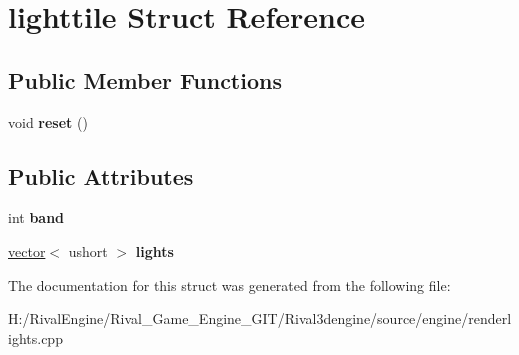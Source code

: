 \hypertarget{structlighttile}{}\section{lighttile Struct Reference}
\label{structlighttile}
\subsection*{Public Member Functions}
\begin{DoxyCompactItemize}
\item 
\mbox{\label{structlighttile_afc9c564e435036b9af2e6812824ee66f}} 
void {\bfseries reset} ()
\end{DoxyCompactItemize}
\subsection*{Public Attributes}
\begin{DoxyCompactItemize}
\item 
\mbox{\label{structlighttile_afc9e0b91b38d692e9393ae8da5444c20}} 
int {\bfseries band}
\item 
\mbox{\label{structlighttile_aaf2046d5d998992b42930d973f6b75be}} 
\hyperlink{structvector}{vector}$<$ ushort $>$ {\bfseries lights}
\end{DoxyCompactItemize}


The documentation for this struct was generated from the following file\+:\begin{DoxyCompactItemize}
\item 
H\+:/\+Rival\+Engine/\+Rival\+\_\+\+Game\+\_\+\+Engine\+\_\+\+G\+I\+T/\+Rival3dengine/source/engine/renderlights.\+cpp\end{DoxyCompactItemize}
